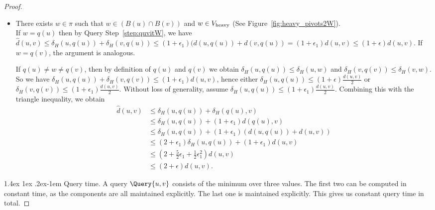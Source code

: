 \documentclass[11pt]{article}
\makeatletter
\theoremstyle{definition}
\theoremstyle{remark}
\renewcommand{\paragraph}{%
  \@startsection{paragraph}{4}%
  {\z@}{1.4ex \@plus 1ex \@minus .2ex}{-1em}%
  {\normalfont\normalsize\bfseries}%
}
\makeatother
\begin{document}
\begin{proof}
\begin{itemize}
\begin{align*}
                &\leq (1+\epsilon_4)(1+\epsilon_2)(d(u,w)+d(v,w))\\
                &= (1+\epsilon_2+\epsilon_2\epsilon_4+\epsilon_4)d(u,v)\\
                &\leq (1+\epsilon)d(u,v).
            \end{align*}
            \item[Case 4:] 
            There exists $w\in \pi$ such that $w\in (B(u)\cap B(v))$ and $w\in V_{\rm{heavy}}$ (See Figure~\ref{fig:heavy_pivots2W}).\\
            If $w=q(u)$ then by Query Step~\ref{step:quvitW}, we have $\hat d(u,v)\leq \delta_H(u,q(u))+\delta_H(v,q(u))\leq (1+\epsilon_1)(d(u,q(u))+d(v,q(u))=(1+\epsilon_1)d(u,v)\leq (1+\epsilon)d(u,v)$. If $w=q(v)$, the argument is analogous. 
            
            If $q(u)\neq w \neq q(v)$, then by definition of $q(u)$ and $q(v)$ we obtain $\delta_H(u,q(u))\leq \delta_H(u,w)$ and $\delta_H(v,q(v))\leq \delta_H(v,w)$. So we have $\delta_H(u,q(u))+\delta_H(v,q(v))\leq (1+\epsilon_1)d(u,v)$, hence either $\delta_H(u,q(u))\leq (1+\epsilon)\tfrac{d(u,v)}{2}$ or $\delta_H(v,q(v))\leq (1+\epsilon_1)\tfrac{d(u,v)}{2}$. Without loss of generality, assume $\delta_H(u,q(u))\leq (1+\epsilon_1) \tfrac{d(u,v)}{2}$. Combining this with the triangle inequality, we obtain
            \begin{align*}
                \hat d(u,v) &\leq \delta_H(u,q(u))+\delta_H(q(u),v)\\
                &\leq \delta_H(u,q(u))+(1+\epsilon_1)d(q(u),v)\\
                &\leq \delta_H(u,q(u))+(1+\epsilon_1)(d(u,q(u))+d(u,v))\\
                &\leq (2+\epsilon_1)\delta_H(u,q(u))+(1+\epsilon_1)d(u,v)\\
                &\leq (2+\tfrac{5}{2}\epsilon_1+\tfrac{1}{2}\epsilon_1^2)d(u,v)\\
                &\leq (2+\epsilon)d(u,v).
            \end{align*}  
    \end{itemize}
            
            
    \paragraph{Query time.}
    A query $\Query{u,v}$ consists of the minimum over three values. The first two can be computed in constant time, as the components are all maintained explicitly. The last one is maintained explicitly. This gives us constant query time in total.
\end{proof}
\end{document}
